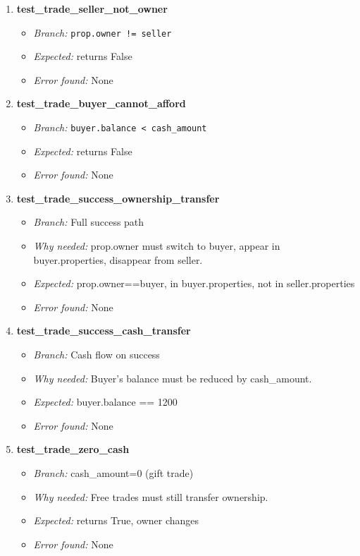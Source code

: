 \documentclass{article}
\begin{document}
\begin{enumerate}[resume, label=\textbf{TC\arabic*.}]

  \item \textbf{test\_trade\_seller\_not\_owner}
  \begin{itemize}[noitemsep]
    \item \textit{Branch:} \texttt{prop.owner != seller}
    \item \textit{Expected:} returns False
    \item \textit{Error found:} None
  \end{itemize}

  \item \textbf{test\_trade\_buyer\_cannot\_afford}
  \begin{itemize}[noitemsep]
    \item \textit{Branch:} \texttt{buyer.balance < cash\_amount}
    \item \textit{Expected:} returns False
    \item \textit{Error found:} None
  \end{itemize}

  \item \textbf{test\_trade\_success\_ownership\_transfer}
  \begin{itemize}[noitemsep]
    \item \textit{Branch:} Full success path
    \item \textit{Why needed:} prop.owner must switch to buyer, appear in buyer.properties, disappear from seller.
    \item \textit{Expected:} prop.owner==buyer, in buyer.properties, not in seller.properties
    \item \textit{Error found:} None
  \end{itemize}

  \item \textbf{test\_trade\_success\_cash\_transfer}
  \begin{itemize}[noitemsep]
    \item \textit{Branch:} Cash flow on success
    \item \textit{Why needed:} Buyer's balance must be reduced by cash\_amount.
    \item \textit{Expected:} buyer.balance == 1200
    \item \textit{Error found:} None
  \end{itemize}

  \item \textbf{test\_trade\_zero\_cash}
  \begin{itemize}[noitemsep]
    \item \textit{Branch:} cash\_amount=0 (gift trade)
    \item \textit{Why needed:} Free trades must still transfer ownership.
    \item \textit{Expected:} returns True, owner changes
    \item \textit{Error found:} None
  \end{itemize}


\end{enumerate}
\end{document}
